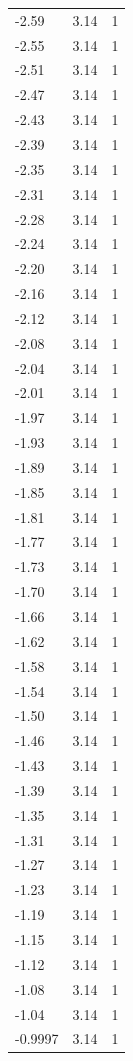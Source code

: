 \begin{longtable}{lrr}
  -2.59 & 3.14 & 1 \\
  -2.55 & 3.14 & 1 \\
  -2.51 & 3.14 & 1 \\
  -2.47 & 3.14 & 1 \\
  -2.43 & 3.14 & 1 \\
  -2.39 & 3.14 & 1 \\
  -2.35 & 3.14 & 1 \\
  -2.31 & 3.14 & 1 \\
  -2.28 & 3.14 & 1 \\
  -2.24 & 3.14 & 1 \\
  -2.20 & 3.14 & 1 \\
  -2.16 & 3.14 & 1 \\
  -2.12 & 3.14 & 1 \\
  -2.08 & 3.14 & 1 \\
  -2.04 & 3.14 & 1 \\
  -2.01 & 3.14 & 1 \\
  -1.97 & 3.14 & 1 \\
  -1.93 & 3.14 & 1 \\
  -1.89 & 3.14 & 1 \\
  -1.85 & 3.14 & 1 \\
  -1.81 & 3.14 & 1 \\
  -1.77 & 3.14 & 1 \\
  -1.73 & 3.14 & 1 \\
  -1.70 & 3.14 & 1 \\
  -1.66 & 3.14 & 1 \\
  -1.62 & 3.14 & 1 \\
  -1.58 & 3.14 & 1 \\
  -1.54 & 3.14 & 1 \\
  -1.50 & 3.14 & 1 \\
  -1.46 & 3.14 & 1 \\
  -1.43 & 3.14 & 1 \\
  -1.39 & 3.14 & 1 \\
  -1.35 & 3.14 & 1 \\
  -1.31 & 3.14 & 1 \\
  -1.27 & 3.14 & 1 \\
  -1.23 & 3.14 & 1 \\
  -1.19 & 3.14 & 1 \\
  -1.15 & 3.14 & 1 \\
  -1.12 & 3.14 & 1 \\
  -1.08 & 3.14 & 1 \\
  -1.04 & 3.14 & 1 \\
  -0.9997 & 3.14 & 1 \\

\end{longtable}

